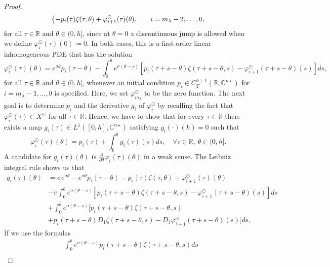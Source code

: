 \documentclass[english]{myarticle}
\begin{document}
\begin{sloppypar}
\begin{proof}
\begin{equation}
\begin{dcases}
    -p_{i}(\tau)\zeta(\tau,\theta) + \varphi_{i+1}^{\odot}(\tau)(\theta), \quad &i=m_\lambda - 2, \dots,0,
    \end{dcases}
\end{equation}
for all $\tau \in \mathbb{R}$ and $\theta \in (0,h]$, since at $\theta = 0$ a discontinuous jump is allowed when we define $\varphi_i^\odot(\tau)(0) \coloneqq 0$. In both cases, this is a first-order linear inhomogeneous PDE that has the solution
\begin{equation*}
    \varphi_i^\odot(\tau)(\theta) =
    e^{\sigma \theta}p_{i}(\tau-\theta) - \int_0^{\theta}e^{\sigma(\theta-s)}[p_i(\tau + s-\theta)\zeta(\tau+s-\theta,s) - \varphi_{i+1}^\odot(\tau+s-\theta)(s) ] ds,
\end{equation*}
for all $\tau \in \mathbb{R}$ and $\theta \in (0,h]$, whenever an initial condition $p_i \in C_T^{k+1}(\mathbb{R},\mathbb{C}^{n \star})$ for $i=m_\lambda-1,\dots,0$ is specified. Here, we set $\varphi_{m_\lambda}^\odot$ to be the zero function. The next goal is to determine $p_i$ and the derivative $g_i$ of $\varphi_i^\odot$ by recalling the fact that $\varphi_i^\odot(\tau) \in X^{\odot}$ for all $\tau \in \mathbb{R}$. Hence, we have to show that for every $\tau \in \mathbb{R}$ there exists a map $g_i(\tau) \in L^1([0,h], \mathbb{C}^{n \star})$ satisfying $g_i(\cdot)(h) = 0$ such that
\begin{equation*}
\varphi_i^{\odot}(\tau)(\theta) = p_i(\tau) + \int_0^\theta g_i(\tau)(s) ds, \quad \forall \tau \in \mathbb{R}, \ \theta \in (0,h].
\end{equation*}
A candidate for $g_i(\tau)(\theta)$ is $\frac{\partial}{\partial \theta}\varphi_i(\tau)(\theta)$ in a weak sense. The Leibniz integral rule shows us that
\begin{align*}
    g_i(\tau)(\theta) &= \sigma e^{\sigma \theta} - e^{\sigma \theta}\dot{p}_i(\tau - \theta)-p_i(\tau) \zeta(\tau,\theta) + \varphi_{i+1}^\odot(\tau)(\theta) \\
    &-\sigma\int_0^\theta e^{\sigma(\theta-s)}[p_i(\tau+s-\theta) \zeta(\tau+s-\theta,s) -\varphi_{i+1}^\odot(\tau+s-\theta)(s)]ds \\
    &+\int_0^\theta e^{\sigma(\theta-s)}[\dot{p}_i(\tau+s-\theta)\zeta(\tau+s-\theta,s) \\
    &+ p_i(\tau+s-\theta) D_1 \zeta(\tau+s-\theta,s) - D_1 \varphi_{i+1}^\odot(\tau+s-\theta)(s)] ds,
\end{align*}
If we use the formulas
\begin{align*}
    &\int_0^\theta e^{\sigma(\theta-s)}\dot{p}_i(\tau+s-\theta) \zeta(\tau+s-\theta,s) ds \\

\end{align*}
\end{proof}
\end{sloppypar}
\end{document}
